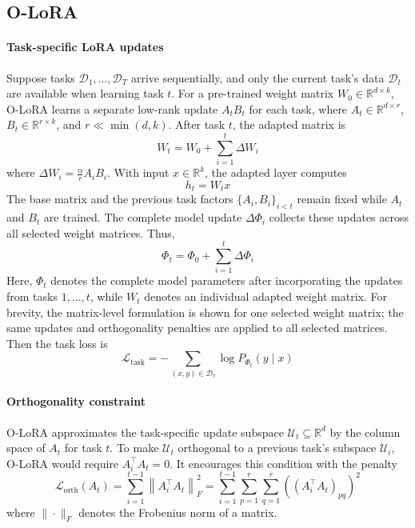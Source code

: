 \subsection{O-LoRA}

\paragraph{Task-specific LoRA updates}

Suppose tasks \(\mathcal{D}_1,\ldots,\mathcal{D}_T\) arrive sequentially, and only the current task's data \(\mathcal{D}_t\) are available when learning task \(t\). For a pre-trained weight matrix \(W_0 \in \mathbb{R}^{d \times k}\), O-LoRA learns a separate low-rank update \(A_t B_t\) for each task, where \(A_t \in \mathbb{R}^{d \times r}\), \(B_t \in \mathbb{R}^{r\times k}\), and \(r \ll \min(d,k)\). After task \(t\), the adapted matrix is
\[
	W_t = W_0 + \sum_{i=1}^{t} \Delta W_i
\]
where \(\Delta W_i = \frac{\alpha}{r} A_i B_i\).
With input \(x\in\mathbb{R}^{k}\), the adapted layer computes
\[
	h_t = W_t x
\]
The base matrix and the previous task factors \(\{A_i,B_i\}_{i<t}\) remain fixed while \(A_t\) and \(B_t\) are trained.
The complete model update \(\Delta\Phi_i\) collects these updates across all selected weight matrices. Thus,
\[
	\Phi_t = \Phi_0+\sum_{i=1}^{t}\Delta\Phi_i
\]
Here, \(\Phi_t\) denotes the complete model parameters after incorporating the updates from tasks \(1,\ldots,t\), while \(W_t\) denotes an individual adapted weight matrix.
For brevity, the matrix-level formulation is shown for one selected weight matrix; the same updates and orthogonality penalties are applied to all selected matrices.
Then the task loss is
\[
	\mathcal{L}_{\mathrm{task}} =
	- \sum_{(x,y)\in\mathcal{D}_t}\log P_{\Phi_t}(y\mid x)
\]

\paragraph{Orthogonality constraint}

O-LoRA approximates the task-specific update subspace \(\mathcal U_t \subseteq \mathbb{R}^{d}\) by the column space of \(A_t\) for task \(t\). To make \(\mathcal{U}_t\) orthogonal to a previous task's subspace \(\mathcal{U}_i\), O-LoRA would require \(A_i^{\top}A_t=0\). It encourages this condition with the penalty
\[
	\mathcal{L}_{\mathrm{orth}}(A_t)
	= \sum_{i=1}^{t-1} \left\|A_i^{\top} A_t\right\|_F^2
	= \sum_{i=1}^{t-1} \sum_{p=1}^{r}\sum_{q=1}^{r} \left((A_i^{\top} A_t)_{pq}\right)^2
\]
where \(\|\cdot\|_F\) denotes the Frobenius norm of a matrix.

